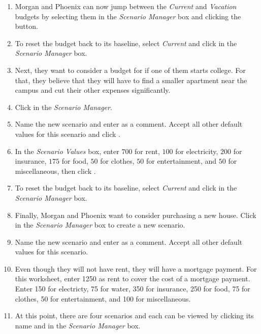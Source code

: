 \begin{enumerate}[resume]	
	
	\item Morgan and Phoenix can now jump between the \textit{Current} and \textit{Vacation} budgets by selecting them in the \textit{Scenario Manager} box and clicking the  button.
	\item To reset the budget back to its baseline, select \textit{Current} and click  in the \textit{Scenario Manager} box.
	\item Next, they want to consider a budget for if one of them starts college. For that, they believe that they will have to find a smaller apartment near the campus and cut their other expenses significantly.
	\item Click  in the \textit{Scenario Manager}.
	\item Name the new scenario  and enter  as a comment. Accept all other default values for this scenario and click .
	\item In the \textit{Scenario Values} box, enter $ 700 $ for rent, $ 100 $ for electricity, $ 200 $ for insurance, $ 175 $ for food, $ 50 $ for clothes, $ 50 $ for entertainment, and $ 50 $ for miscellaneous, then click .
	\item To reset the budget back to its baseline, select \textit{Current} and click  in the \textit{Scenario Manager} box.
	\item Finally, Morgan and Phoenix want to consider purchasing a new house. Click  in the \textit{Scenario Manager} box to create a new scenario.
	\item Name the new scenario  and enter  as a comment. Accept all other default values for this scenario.
	\item Even though they will not have rent, they will have a mortgage payment. For this worksheet, enter 1250 as rent to cover the cost of a mortgage payment. Enter 150 for electricty, 75 for water, 350 for insurance, 250 for food, 75 for clothes, 50 for entertainment, and 100 for miscellaneous.
	\item At this point, there are four scenarios and each can be viewed by clicking its name and  in the \textit{Scenario Manager} box. 
	
\end{enumerate}

